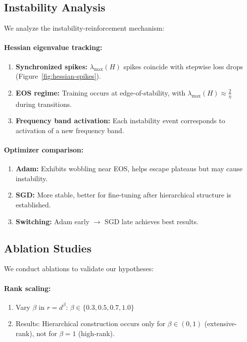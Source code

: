 \subsection{Instability Analysis}

We analyze the instability-reinforcement mechanism:

\paragraph{Hessian eigenvalue tracking:}
\begin{enumerate}
    \item \textbf{Synchronized spikes:} $\lambda_{\max}(H)$ spikes coincide with stepwise loss drops (Figure~\ref{fig:hessian-spikes}).
    \item \textbf{EOS regime:} Training occurs at edge-of-stability, with $\lambda_{\max}(H) \approx \frac{2}{\eta}$ during transitions.
    \item \textbf{Frequency band activation:} Each instability event corresponds to activation of a new frequency band.
\end{enumerate}

\paragraph{Optimizer comparison:}
\begin{enumerate}
    \item \textbf{Adam:} Exhibits wobbling near EOS, helps escape plateaus but may cause instability.
    \item \textbf{SGD:} More stable, better for fine-tuning after hierarchical structure is established.
    \item \textbf{Switching:} Adam early $\to$ SGD late achieves best results.
\end{enumerate}

\subsection{Ablation Studies}

We conduct ablations to validate our hypotheses:

\paragraph{Rank scaling:}
\begin{enumerate}
    \item Vary $\beta$ in $r = d^\beta$: $\beta \in \{0.3, 0.5, 0.7, 1.0\}$
    \item Results: Hierarchical construction occurs only for $\beta \in (0, 1)$ (extensive-rank), not for $\beta = 1$ (high-rank).
\end{enumerate}


